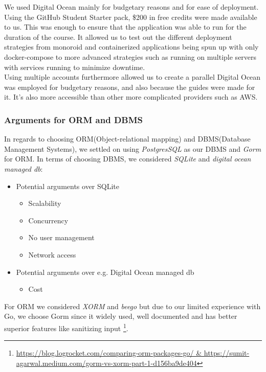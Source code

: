 We used Digital Ocean mainly for budgetary reasons and for ease of deployment. Using the GitHub Student 
Starter pack, \$200 in free credits were made available to us. This was enough to ensure that the application 
was able to run for the duration of the course. It allowed us to test out the different deployment strategies
from monoroid and containerized applications being spun up with only docker-compose to more advanced strategies such as
running on multiple servers with services running to minimize downtime.\\

Using multiple accounts furthermore allowed us to create a parallel Digital Ocean was employed for budgetary reasons, and also because the guides were made for it.
It's also more accessible than other more complicated providers such as AWS. 

\subsubsection{Arguments for ORM and DBMS}
In regards to choosing ORM(Object-relational mapping) and DBMS(Database Management Systems), we settled on 
using \textit{PostgresSQL} as our DBMS and \textit{Gorm} for ORM. In terms of choosing DBMS, we considered 
\textit{SQLite} and \textit{digital ocean managed db}:
\begin{itemize}
    \item Potential arguments over SQLite 
    \begin{itemize}
        \item Scalability
        \item Concurrency
        \item No user management
        \item Network access        
    \end{itemize}
    \item Potential arguments over e.g. Digital Ocean managed db
    \begin{itemize}
        \item Cost
    \end{itemize}
\end{itemize}

For ORM we considered \textit{XORM} and \textit{beego} but due to our limited experience with Go, we choose Gorm 
since it widely used, well documented and has better superior features like sanitizing input \footnote{\url{https://blog.logrocket.com/comparing-orm-packages-go/ & https://sumit-agarwal.medium.com/gorm-vs-xorm-part-1-d156ba9de404}}.


